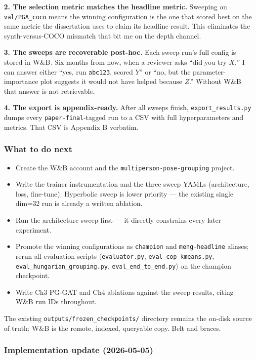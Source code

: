 \textbf{2. The selection metric matches the headline metric.} Sweeping on \texttt{val/PGA\_coco} means the winning configuration is the one that scored best on the same metric the dissertation uses to claim its headline result. This eliminates the synth-versus-COCO mismatch that bit me on the depth channel.

\textbf{3. The sweeps are recoverable post-hoc.} Each sweep run's full config is stored in W\&B. Six months from now, when a reviewer asks ``did you try $X$,'' I can answer either ``yes, run \texttt{abc123}, scored $Y$'' or ``no, but the parameter-importance plot suggests it would not have helped because $Z$.'' Without W\&B that answer is not retrievable.

\textbf{4. The export is appendix-ready.} After all sweeps finish, \texttt{export\_results.py} dumps every \texttt{paper-final}-tagged run to a CSV with full hyperparameters and metrics. That CSV is Appendix B verbatim.

\subsubsection{What to do next}

\begin{itemize}
    \item Create the W\&B account and the \texttt{multiperson-pose-grouping} project.
    \item Write the trainer instrumentation and the three sweep YAMLs (architecture, loss, fine-tune). Hyperbolic sweep is lower priority --- the existing single dim=32 run is already a written ablation.
    \item Run the architecture sweep first --- it directly constrains every later experiment.
    \item Promote the winning configurations as \texttt{champion} and \texttt{meng-headline} aliases; rerun all evaluation scripts (\texttt{evaluator.py}, \texttt{eval\_cop\_kmeans.py}, \texttt{eval\_hungarian\_grouping.py}, \texttt{eval\_end\_to\_end.py}) on the champion checkpoint.
    \item Write Ch3 PG-GAT and Ch4 ablations against the sweep results, citing W\&B run IDs throughout.
\end{itemize}

The existing \texttt{outputs/frozen\_checkpoints/} directory remains the on-disk source of truth; W\&B is the remote, indexed, queryable copy. Belt and braces.

\subsubsection{Implementation update (2026-05-05)}

